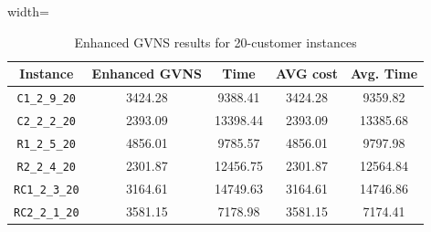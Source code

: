 \documentclass{article}
\begin{document}
\begin{table}[h]
\centering
\small
\setlength{\tabcolsep}{4pt}
\caption{Enhanced GVNS results for 20-customer instances}
\vspace{4mm}
\begin{adjustbox}{width=\textwidth}
\begin{tabular}{c c c c c}
\toprule
Instance & Enhanced GVNS & Time & AVG cost & Avg. Time \\
\midrule
\texttt{C1\_2\_9\_20} & 3424.28 & 9388.41 & 3424.28 & 9359.82 \\
\texttt{C2\_2\_2\_20} & 2393.09 & 13398.44 & 2393.09 & 13385.68 \\
\texttt{R1\_2\_5\_20} & 4856.01 & 9785.57 & 4856.01 & 9797.98 \\
\texttt{R2\_2\_4\_20} & 2301.87 & 12456.75 & 2301.87 & 12564.84 \\
\texttt{RC1\_2\_3\_20} & 3164.61 & 14749.63 & 3164.61 & 14746.86 \\
\texttt{RC2\_2\_1\_20} & 3581.15 & 7178.98 & 3581.15 & 7174.41 \\
\bottomrule
\end{tabular}
\end{adjustbox}
\end{table}
\end{document}
